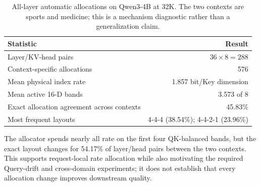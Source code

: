 \begin{table}[H]
\caption{All-layer automatic allocations on Qwen3-4B at 32K.  The two
contexts are sports and medicine; this is a mechanism diagnostic rather than
a generalization claim.}
\label{tab:all-layer-allocation}
\centering
\begin{tabular}{lr}
\toprule
Statistic & Result \\
\midrule
Layer/KV-head pairs & $36\times8=288$ \\
Context-specific allocations & 576 \\
Mean physical index rate & 1.857 bit/Key dimension \\
Mean active 16-D bands & 3.573 of 8 \\
Exact allocation agreement across contexts & 45.83\% \\
Most frequent layouts & 4-4-4 (38.54\%); 4-4-2-1 (23.96\%) \\
\bottomrule
\end{tabular}
\end{table}

\FloatBarrier
The allocator spends nearly all rate on the first four QK-balanced bands, but
the exact layout changes for 54.17\% of layer/head pairs between the two
contexts.  This supports request-local rate allocation while also motivating
the required Query-drift and cross-domain experiments; it does not establish
that every allocation change improves downstream quality.

\begin{table}[H]
\caption{Matched QKSieve--FIER retrieval audit on Qwen3-4B at 32K.
The 18,432 held-out query-head conditions span all 36 layers, two contexts,
and eight Query steps not used by QKSieve calibration.  FIER is our
paper-specification reproduction of 1-bit RTN with sequence-group size 32
because no official implementation was available.}
\label{tab:fier-heldout}
\centering
{}
\end{table}

